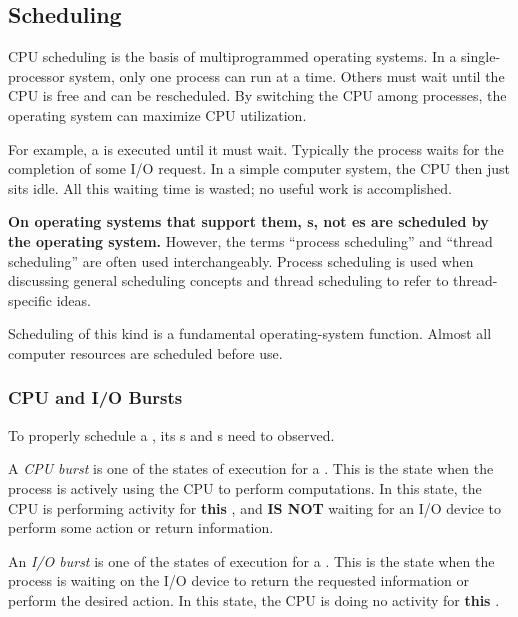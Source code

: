 \subsection{Scheduling}\label{subsec:Scheduling}
CPU scheduling is the basis of multiprogrammed operating systems.
In a single-processor system, only one process can run at a time.
Others must wait until the CPU is free and can be rescheduled.
By switching the CPU among processes, the operating system can maximize CPU utilization.

For example, a  is executed until it must wait.
Typically the process waits for the completion of some I/O request.
In a simple computer system, the CPU then just sits idle.
All this waiting time is wasted; no useful work is accomplished.

\begin{blackbox}
  \textbf{On operating systems that support them, s, not es are scheduled by the operating system.}
  However, the terms ``process scheduling'' and ``thread scheduling'' are often used interchangeably.
  Process scheduling is used when discussing general scheduling concepts and thread scheduling to refer to thread-specific ideas.
\end{blackbox}

Scheduling of this kind is a fundamental operating-system function.
Almost all computer resources are scheduled before use.

\subsubsection{CPU and I/O Bursts}\label{subsubsec:CPU_IO_Bursts}
To properly schedule a , its s and s need to observed.

\begin{definition}\label{def:CPU_Burst}
  A \emph{CPU burst} is one of the states of execution for a .
  This is the state when the process is actively using the CPU to perform computations.
  In this state, the CPU is performing activity for \textbf{this} , and \textbf{IS NOT} waiting for an I/O device to perform some action or return information.
\end{definition}

\begin{definition}[I/O Burst]\label{def:I/O_Burst}
  An \emph{I/O burst} is one of the states of execution for a .
  This is the state when the process is waiting on the I/O device to return the requested information or perform the desired action.
  In this state, the CPU is doing no activity for \textbf{this} .
\end{definition}


